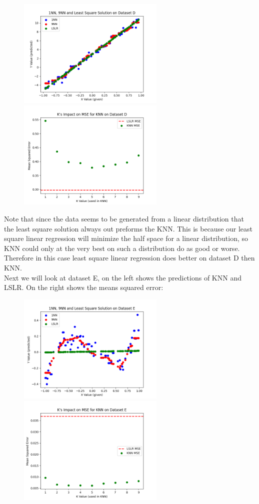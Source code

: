 \documentclass{article}
\begin{document}
\begin{titlepage}
\begin{figure}[H]
    \centering
{{\includegraphics[width=7cm]{D_1.png} }}%
    \qquad
{{\includegraphics[width=7cm]{D_2.png} }}%
\end{figure}


Note that since the data seems to be generated from a linear distribution that the least square solution always out preforms the KNN. This is because our least square linear regression will minimize the half space for a linear distribution, so KNN could only at the very best on such a distribution do as good or worse. Therefore in this case least square linear regression does better on dataset D then KNN. \\

Next we will look at dataset E, on the left shows the predictions of KNN and LSLR. On the right shows the means squared error: \\

\begin{figure}[H]
    \centering
{{\includegraphics[width=7cm]{E_1.png} }}%
    \qquad
{{\includegraphics[width=7cm]{E_2.png} }}%
\end{figure}



\end{titlepage}
\end{document}

